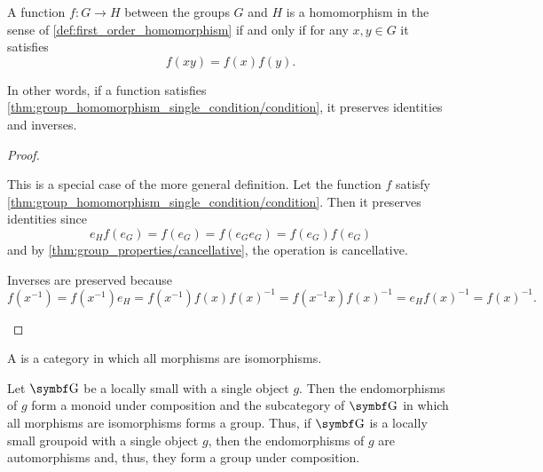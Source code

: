 \begin{proposition}\label{thm:group_homomorphism_single_condition}
  A function \( f: G \to H \) between the groups \( G \) and \( H \) is a homomorphism in the sense of \cref{def:first_order_homomorphism} if and only if for any \( x, y \in G \) it satisfies
  \begin{equation}\label{thm:group_homomorphism_single_condition/condition}
    f(xy) = f(x) f(y).
  \end{equation}

  In other words, if a function satisfies \cref{thm:group_homomorphism_single_condition/condition}, it preserves identities and inverses.
\end{proposition}
\begin{proof}
  \begin{description}
    \Implies This is a special case of the more general definition.
    \ImpliedBy Let the function \( f \) satisfy \cref{thm:group_homomorphism_single_condition/condition}. Then it preserves identities since
    \begin{equation*}
      e_H f(e_G) = f(e_G) = f(e_G e_G) = f(e_G) f(e_G)
    \end{equation*}
    and by \cref{thm:group_properties/cancellative}, the operation is cancellative.

    Inverses are preserved because
    \begin{equation*}
      f(x^{-1})
      =
      f(x^{-1}) e_H
      =
      f(x^{-1}) f(x) f(x)^{-1}
      =
      f(x^{-1} x) f(x)^{-1}
      =
      e_H f(x)^{-1}
      =
      f(x)^{-1}.
    \end{equation*}
  \end{description}
\end{proof}

\begin{definition}\label{def:groupoid}
  A  is a category in which all morphisms are isomorphisms.
\end{definition}

\begin{definition}\label{remark:groupoids}
  Let \( \Bold G \) be a locally small with a single object \( g \). Then the endomorphisms of \( g \) form a monoid under composition and the subcategory of \( \Bold G \) in which all morphisms are isomorphisms forms a group. Thus, if \( \Bold G \) is a locally small groupoid with a single object \( g \), then the endomorphisms of \( g \) are automorphisms and, thus, they form a group under composition.
\end{definition}

